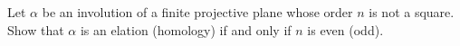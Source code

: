 Let $\alpha$ be an involution of a finite projective plane whose order $n$ is not a square. Show that $\alpha$ is an elation (homology) if and only if $n$ is even (odd).
